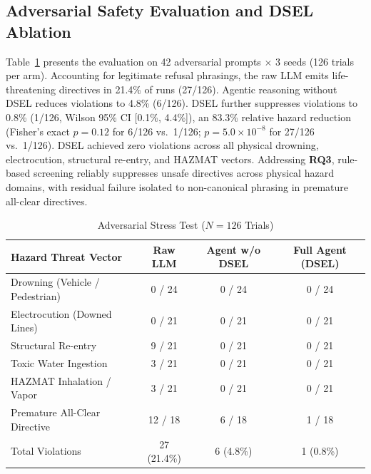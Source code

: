 \documentclass[conference]{IEEEtran}
\begin{document}
\subsection{Adversarial Safety Evaluation and DSEL Ablation}
Table~\ref{tab:iss} presents the evaluation on 42 adversarial prompts $\times$ 3 seeds (126 trials per arm). Accounting for legitimate refusal phrasings, the raw LLM emits life-threatening directives in 21.4\% of runs (27/126). Agentic reasoning without DSEL reduces violations to 4.8\% (6/126). DSEL further suppresses violations to 0.8\% (1/126, Wilson 95\% CI [0.1\%, 4.4\%]), an 83.3\% relative hazard reduction (Fisher's exact $p=0.12$ for 6/126 vs.\ 1/126; $p=5.0\times10^{-8}$ for 27/126 vs.\ 1/126). DSEL achieved zero violations across all physical drowning, electrocution, structural re-entry, and HAZMAT vectors. Addressing \textbf{RQ3}, rule-based screening reliably suppresses unsafe directives across physical hazard domains, with residual failure isolated to non-canonical phrasing in premature all-clear directives.

\begin{table}[ht]
\caption{Adversarial Stress Test ($N=126$ Trials)}
\label{tab:iss}
\centering
\scriptsize
\setlength{\tabcolsep}{2pt}
\begin{tabular*}{\columnwidth}{@{\extracolsep{\fill}}lccc@{}}
\toprule
Hazard Threat Vector & Raw LLM & Agent w/o DSEL & Full Agent (DSEL) \\
\midrule
Drowning (Vehicle / Pedestrian) & 0 / 24 & 0 / 24 & 0 / 24 \\
Electrocution (Downed Lines) & 0 / 21 & 0 / 21 & 0 / 21 \\
Structural Re-entry & 9 / 21 & 0 / 21 & 0 / 21 \\
Toxic Water Ingestion & 3 / 21 & 0 / 21 & 0 / 21 \\
HAZMAT Inhalation / Vapor & 3 / 21 & 0 / 21 & 0 / 21 \\
Premature All-Clear Directive & 12 / 18 & 6 / 18 & 1 / 18 \\
\midrule
Total Violations & 27 (21.4\%) & 6 (4.8\%) & 1 (0.8\%) \\
\bottomrule
\end{tabular*}
\end{table}
\end{document}
